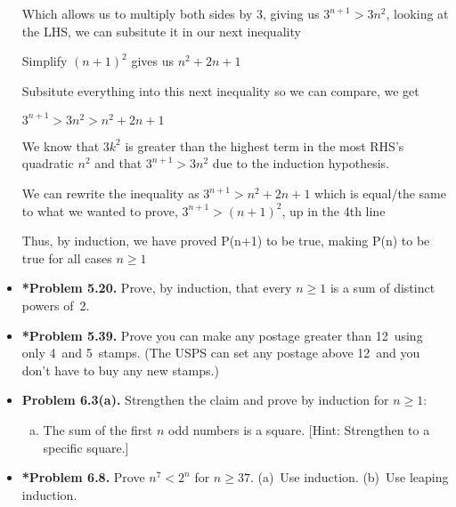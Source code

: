 \documentclass[11pt]{article}
\begin{document}
\begin{itemize}
  Which allows us to multiply both sides by 3, giving us $3^{n+1} > 3n^2$, looking at the LHS, we can subsitute it in our next inequality

  Simplify $(n+1)^2$ gives us $ n^2 + 2n +1$
  
  Subsitute everything into this next inequality so we can compare, we get

  $3^{n+1} > 3n^2 > n^2 + 2n + 1$

  We know that $3k^2$ is greater than the highest term in the most RHS's quadratic $n^2$ and that $3^{n+1} > 3n^2$ due to the induction hypothesis. 

  We can rewrite the inequality as $3^{n+1} > n^2 + 2n + 1$ which is equal/the same to what we wanted to prove, $3^{n+1} > (n+1)^2$, up in the 4th line
  
  Thus, by induction, we have proved P(n+1) to be true, making P(n) to be true for all cases $n \geq 1$

\vspace{0.1in}

\item \textbf{*Problem 5.20.}
  Prove, by induction, that every $n\ge 1$ is a sum of distinct powers of~2.

\vspace{0.1in}

\item \textbf{*Problem 5.39.}
  Prove you can make any postage greater than 12\textcent\
  using only 4\textcent\  and 5\textcent\  stamps.
  (The USPS can set any postage above 12\textcent\  and you don't have to buy any new stamps.)

\vspace{0.1in}

\item \textbf{Problem 6.3(a).}
  Strengthen the claim and prove by induction for $n\ge 1$:
  \begin{enumerate}[(a)]
  \item The sum of the first $n$ odd numbers is a square.
    [Hint: Strengthen to a specific square.]
  \end{enumerate}

\vspace{0.1in}

\item \textbf{*Problem 6.8.}
  Prove $n^7<2^n$ for $n\ge 37$.
  (a)~Use induction.
  (b)~Use leaping induction.

\vspace{0.1in}


\end{itemize}
\end{document}
